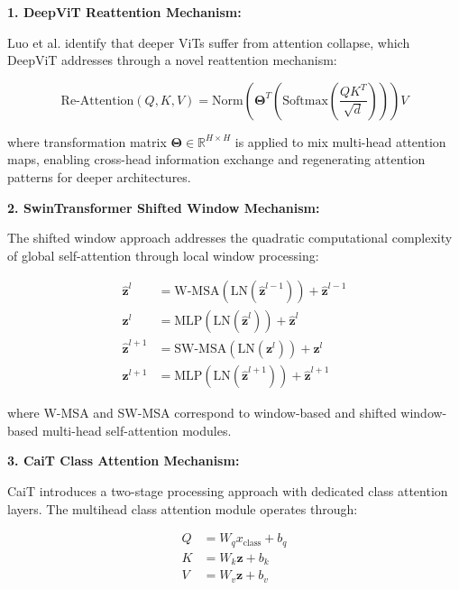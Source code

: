 \documentclass[journal]{IEEEtran}
\begin{document}
\textbf{1. DeepViT Reattention Mechanism:}

Luo et al. identify that deeper ViTs suffer from attention collapse, which DeepViT addresses through a novel reattention mechanism:

\begin{equation}
\text{Re-Attention}(Q, K, V) = \text{Norm}\left(\boldsymbol{\Theta}^T\left(\text{Softmax}\left(\frac{QK^T}{\sqrt{d}}\right)\right)\right)V
\label{eq:vit_reattention}
\end{equation}

where transformation matrix $\boldsymbol{\Theta} \in \mathbb{R}^{H \times H}$ is applied to mix multi-head attention maps, enabling cross-head information exchange and regenerating attention patterns for deeper architectures.

\textbf{2. SwinTransformer Shifted Window Mechanism:}

The shifted window approach addresses the quadratic computational complexity of global self-attention through local window processing:

\begin{align}
\hat{\mathbf{z}}^l &= \text{W-MSA}(\text{LN}(\hat{\mathbf{z}}^{l-1})) + \hat{\mathbf{z}}^{l-1} \label{eq:vit_swin_1} \\
\mathbf{z}^l &= \text{MLP}(\text{LN}(\hat{\mathbf{z}}^l)) + \hat{\mathbf{z}}^l \label{eq:vit_swin_2} \\
\hat{\mathbf{z}}^{l+1} &= \text{SW-MSA}(\text{LN}(\mathbf{z}^l)) + \mathbf{z}^l \label{eq:vit_swin_3} \\
\mathbf{z}^{l+1} &= \text{MLP}(\text{LN}(\hat{\mathbf{z}}^{l+1})) + \hat{\mathbf{z}}^{l+1} \label{eq:vit_swin_4}
\end{align}

where W-MSA and SW-MSA correspond to window-based and shifted window-based multi-head self-attention modules.

\textbf{3. CaiT Class Attention Mechanism:}

CaiT introduces a two-stage processing approach with dedicated class attention layers. The multihead class attention module operates through:

\begin{align}
Q &= W_q x_{\text{class}} + b_q \label{eq:vit_cait_q} \\
K &= W_k \mathbf{z} + b_k \label{eq:vit_cait_k} \\
V &= W_v \mathbf{z} + b_v \label{eq:vit_cait_v}
\end{align}
\end{document}
